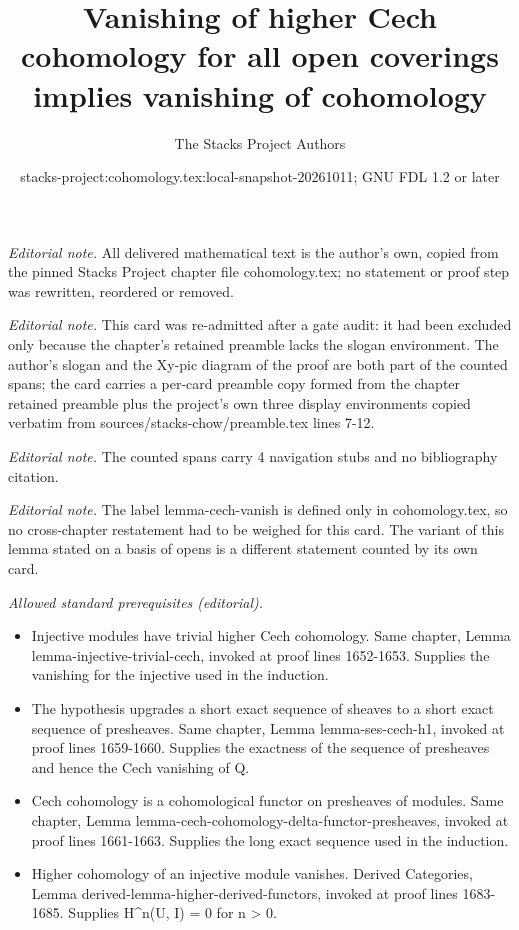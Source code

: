 \documentclass[10pt,a4paper]{amsart}
\title{Vanishing of higher Cech cohomology for all open coverings implies vanishing of cohomology}
\author{The Stacks Project Authors}
\date{stacks-project:cohomology.tex:local-snapshot-20261011; GNU FDL 1.2 or later}
\theoremstyle{plain}
\theoremstyle{definition}
\theoremstyle{remark}
\numberwithin{equation}{subsection}
\begin{document}
\maketitle
\noindent\textit{Editorial note.} All delivered mathematical text is the author's own, copied from the pinned Stacks Project chapter file cohomology.tex; no statement or proof step was rewritten, reordered or removed.\par\medskip
\noindent\textit{Editorial note.} This card was re-admitted after a gate audit: it had been excluded only because the chapter's retained preamble lacks the slogan environment. The author's slogan and the Xy-pic diagram of the proof are both part of the counted spans; the card carries a per-card preamble copy formed from the chapter retained preamble plus the project's own three display environments copied verbatim from sources/stacks-chow/preamble.tex lines 7-12.\par\medskip
\noindent\textit{Editorial note.} The counted spans carry 4 navigation stubs and no bibliography citation.\par\medskip
\noindent\textit{Editorial note.} The label lemma-cech-vanish is defined only in cohomology.tex, so no cross-chapter restatement had to be weighed for this card. The variant of this lemma stated on a basis of opens is a different statement counted by its own card.\par\medskip
\noindent\textit{Allowed standard prerequisites (editorial).}\begin{itemize}
\item Injective modules have trivial higher Cech cohomology. Same chapter, Lemma lemma-injective-trivial-cech, invoked at proof lines 1652-1653. Supplies the vanishing for the injective used in the induction.
\item The hypothesis upgrades a short exact sequence of sheaves to a short exact sequence of presheaves. Same chapter, Lemma lemma-ses-cech-h1, invoked at proof lines 1659-1660. Supplies the exactness of the sequence of presheaves and hence the Cech vanishing of Q.
\item Cech cohomology is a cohomological functor on presheaves of modules. Same chapter, Lemma lemma-cech-cohomology-delta-functor-presheaves, invoked at proof lines 1661-1663. Supplies the long exact sequence used in the induction.
\item Higher cohomology of an injective module vanishes. Derived Categories, Lemma derived-lemma-higher-derived-functors, invoked at proof lines 1683-1685. Supplies H\textasciicircum{}n(U, I) = 0 for n > 0.
\end{itemize}\medskip
\end{document}
